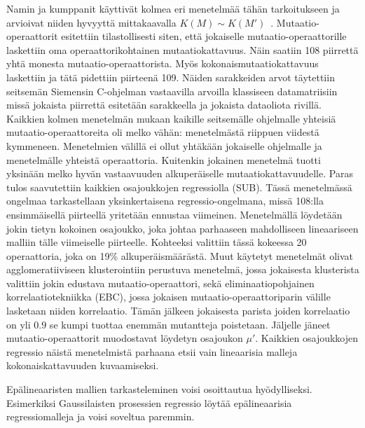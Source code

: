 \documentclass[finnish]{tktltiki2}
\begin{document}
Namin ja kumppanit käyttivät kolmea eri menetelmää tähän tarkoitukseen ja arvioivat niiden hyvyyttä mittakaavalla $K(M) \sim K(M')$~\cite{NaminA06}. Mutaatio-operaattorit esitettiin tilastollisesti siten, että jokaiselle mutaatio-operaattorille laskettiin oma operaattorikohtainen mutaatiokattavuus. Näin saatiin 108 piirrettä yhtä monesta mutaatio-operaattorista. Myös kokonaismutaatiokattavuus laskettiin ja tätä pidettiin piirteenä 109. Näiden sarakkeiden arvot täytettiin seitsemän Siemensin C-ohjelman vastaavilla arvoilla klassiseen datamatriisiin missä jokaista piirrettä esitetään sarakkeella ja jokaista dataoliota rivillä. Kaikkien kolmen menetelmän mukaan kaikille seitsemälle ohjelmalle yhteisiä mutaatio-operaattoreita oli melko vähän: menetelmästä riippuen viidestä kymmeneen. Menetelmien välillä ei ollut yhtäkään jokaiselle ohjelmalle ja menetelmälle yhteistä operaattoria. Kuitenkin jokainen menetelmä tuotti yksinään melko hyvän vastaavuuden alkuperäiselle mutaatiokattavuudelle. Paras tulos saavutettiin kaikkien osajoukkojen regressiolla (SUB). Tässä menetelmässä ongelmaa tarkastellaan yksinkertaisena regressio-ongelmana, missä 108:lla ensimmäisellä piirteellä yritetään ennustaa viimeinen. Menetelmällä löydetään jokin tietyn kokoinen osajoukko, joka johtaa parhaaseen mahdolliseen lineaariseen malliin tälle viimeiselle piirteelle. Kohteeksi valittiin tässä kokeessa 20 operaattoria, joka on 19\% alkuperäismäärästä. Muut käytetyt menetelmät olivat agglomeratiiviseen klusterointiin perustuva menetelmä, jossa jokaisesta klusterista valittiin jokin edustava mutaatio-operaattori, sekä eliminaatiopohjainen korrelaatiotekniikka (EBC), jossa jokaisen mutaatio-operaattoriparin välille lasketaan niiden korrelaatio. Tämän jälkeen jokaisesta parista joiden korrelaatio on yli $0.9$ se kumpi tuottaa enemmän mutantteja poistetaan. Jäljelle jäneet mutaatio-operaattorit muodostavat löydetyn osajoukon $\mu'$. Kaikkien osajoukkojen regressio näistä menetelmistä parhaana etsii vain lineaarisia malleja kokonaiskattavuuden kuvaamiseksi. 

Epälineaaristen mallien tarkasteleminen voisi osoittautua hyödylliseksi. Esimerkiksi Gaussilaisten prosessien regressio löytää epälineaarisia regressiomalleja ja voisi soveltua paremmin.
\end{document}
